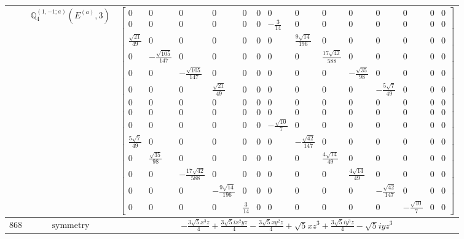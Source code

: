 \documentclass[fleqn,8pt,landscape]{jsarticle}
\begin{document}
\begin{longtable}{ccc}
$  $ & $ \mathbb{Q}_{4}^{(1,-1;a)}(E^{(a)},3) $ & $ \begin{bmatrix} 0 & 0 & 0 & 0 & 0 & 0 & 0 & 0 & 0 & 0 & 0 & 0 & 0 & 0 \\ 0 & 0 & 0 & 0 & 0 & 0 & - \frac{3}{14} & 0 & 0 & 0 & 0 & 0 & 0 & 0 \\ \frac{\sqrt{21}}{49} & 0 & 0 & 0 & 0 & 0 & 0 & \frac{9 \sqrt{14}}{196} & 0 & 0 & 0 & 0 & 0 & 0 \\ 0 & - \frac{\sqrt{105}}{147} & 0 & 0 & 0 & 0 & 0 & 0 & \frac{17 \sqrt{42}}{588} & 0 & 0 & 0 & 0 & 0 \\ 0 & 0 & - \frac{\sqrt{105}}{147} & 0 & 0 & 0 & 0 & 0 & 0 & - \frac{\sqrt{35}}{98} & 0 & 0 & 0 & 0 \\ 0 & 0 & 0 & \frac{\sqrt{21}}{49} & 0 & 0 & 0 & 0 & 0 & 0 & - \frac{5 \sqrt{7}}{49} & 0 & 0 & 0 \\ 0 & 0 & 0 & 0 & 0 & 0 & 0 & 0 & 0 & 0 & 0 & 0 & 0 & 0 \\ 0 & 0 & 0 & 0 & 0 & 0 & 0 & 0 & 0 & 0 & 0 & 0 & 0 & 0 \\ 0 & 0 & 0 & 0 & 0 & 0 & - \frac{\sqrt{10}}{7} & 0 & 0 & 0 & 0 & 0 & 0 & 0 \\ \frac{5 \sqrt{7}}{49} & 0 & 0 & 0 & 0 & 0 & 0 & - \frac{\sqrt{42}}{147} & 0 & 0 & 0 & 0 & 0 & 0 \\ 0 & \frac{\sqrt{35}}{98} & 0 & 0 & 0 & 0 & 0 & 0 & \frac{4 \sqrt{14}}{49} & 0 & 0 & 0 & 0 & 0 \\ 0 & 0 & - \frac{17 \sqrt{42}}{588} & 0 & 0 & 0 & 0 & 0 & 0 & \frac{4 \sqrt{14}}{49} & 0 & 0 & 0 & 0 \\ 0 & 0 & 0 & - \frac{9 \sqrt{14}}{196} & 0 & 0 & 0 & 0 & 0 & 0 & - \frac{\sqrt{42}}{147} & 0 & 0 & 0 \\ 0 & 0 & 0 & 0 & \frac{3}{14} & 0 & 0 & 0 & 0 & 0 & 0 & - \frac{\sqrt{10}}{7} & 0 & 0 \end{bmatrix} $ \\ \hline
$ 868 $ & $ \text{symmetry} $ & $ - \frac{3 \sqrt{5} x^{3} z}{4} + \frac{3 \sqrt{5} i x^{2} y z}{4} - \frac{3 \sqrt{5} x y^{2} z}{4} + \sqrt{5} x z^{3} + \frac{3 \sqrt{5} i y^{3} z}{4} - \sqrt{5} i y z^{3} $ \\

\end{longtable}
\end{document}
